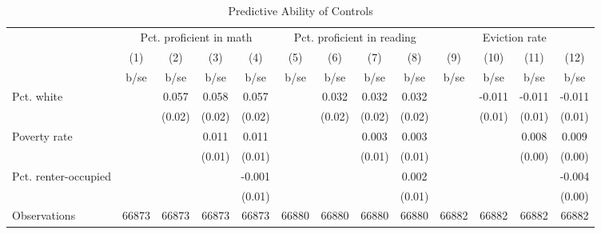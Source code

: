 \begin{table}[htbp]\centering
\def\sym#1{\ifmmode^{#1}\else\(^{#1}\)\fi}
\caption{Predictive Ability of Controls}
\begin{tabular}{l*{12}{c}}
\toprule
                    &\multicolumn{4}{c}{Pct. proficient in math}        &\multicolumn{4}{c}{Pct. proficient in reading}     &\multicolumn{4}{c}{Eviction rate}                  \\\cmidrule(lr){2-5}\cmidrule(lr){6-9}\cmidrule(lr){10-13}
                    &\multicolumn{1}{c}{(1)}&\multicolumn{1}{c}{(2)}&\multicolumn{1}{c}{(3)}&\multicolumn{1}{c}{(4)}&\multicolumn{1}{c}{(5)}&\multicolumn{1}{c}{(6)}&\multicolumn{1}{c}{(7)}&\multicolumn{1}{c}{(8)}&\multicolumn{1}{c}{(9)}&\multicolumn{1}{c}{(10)}&\multicolumn{1}{c}{(11)}&\multicolumn{1}{c}{(12)}\\
                    &        b/se&        b/se&        b/se&        b/se&        b/se&        b/se&        b/se&        b/se&        b/se&        b/se&        b/se&        b/se\\
\midrule
\hspace{0.25cm} Pct. white&            &       0.057&       0.058&       0.057&            &       0.032&       0.032&       0.032&            &      -0.011&      -0.011&      -0.011\\
                    &            &      (0.02)&      (0.02)&      (0.02)&            &      (0.02)&      (0.02)&      (0.02)&            &      (0.01)&      (0.01)&      (0.01)\\
\hspace{0.25cm} Poverty rate&            &            &       0.011&       0.011&            &            &       0.003&       0.003&            &            &       0.008&       0.009\\
                    &            &            &      (0.01)&      (0.01)&            &            &      (0.01)&      (0.01)&            &            &      (0.00)&      (0.00)\\
\hspace{0.25cm} Pct. renter-occupied&            &            &            &      -0.001&            &            &            &       0.002&            &            &            &      -0.004\\
                    &            &            &            &      (0.01)&            &            &            &      (0.01)&            &            &            &      (0.00)\\
\midrule
Observations        &       66873&       66873&       66873&       66873&       66880&       66880&       66880&       66880&       66882&       66882&       66882&       66882\\

\end{tabular}
\end{table}
